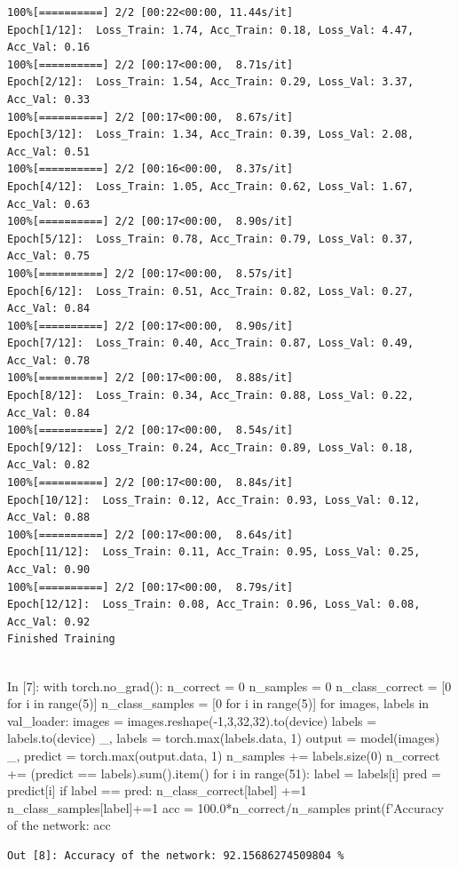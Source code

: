 \documentclass[12pt, a4paper]{article}
\begin{document}
\begin{verbatim}
100%[==========] 2/2 [00:22<00:00, 11.44s/it]
Epoch[1/12]:  Loss_Train: 1.74, Acc_Train: 0.18, Loss_Val: 4.47, Acc_Val: 0.16
100%[==========] 2/2 [00:17<00:00,  8.71s/it]
Epoch[2/12]:  Loss_Train: 1.54, Acc_Train: 0.29, Loss_Val: 3.37, Acc_Val: 0.33
100%[==========] 2/2 [00:17<00:00,  8.67s/it]
Epoch[3/12]:  Loss_Train: 1.34, Acc_Train: 0.39, Loss_Val: 2.08, Acc_Val: 0.51
100%[==========] 2/2 [00:16<00:00,  8.37s/it]
Epoch[4/12]:  Loss_Train: 1.05, Acc_Train: 0.62, Loss_Val: 1.67, Acc_Val: 0.63
100%[==========] 2/2 [00:17<00:00,  8.90s/it]
Epoch[5/12]:  Loss_Train: 0.78, Acc_Train: 0.79, Loss_Val: 0.37, Acc_Val: 0.75
100%[==========] 2/2 [00:17<00:00,  8.57s/it]
Epoch[6/12]:  Loss_Train: 0.51, Acc_Train: 0.82, Loss_Val: 0.27, Acc_Val: 0.84
100%[==========] 2/2 [00:17<00:00,  8.90s/it]
Epoch[7/12]:  Loss_Train: 0.40, Acc_Train: 0.87, Loss_Val: 0.49, Acc_Val: 0.78
100%[==========] 2/2 [00:17<00:00,  8.88s/it]
Epoch[8/12]:  Loss_Train: 0.34, Acc_Train: 0.88, Loss_Val: 0.22, Acc_Val: 0.84
100%[==========] 2/2 [00:17<00:00,  8.54s/it]
Epoch[9/12]:  Loss_Train: 0.24, Acc_Train: 0.89, Loss_Val: 0.18, Acc_Val: 0.82
100%[==========] 2/2 [00:17<00:00,  8.84s/it]
Epoch[10/12]:  Loss_Train: 0.12, Acc_Train: 0.93, Loss_Val: 0.12, Acc_Val: 0.88
100%[==========] 2/2 [00:17<00:00,  8.64s/it]
Epoch[11/12]:  Loss_Train: 0.11, Acc_Train: 0.95, Loss_Val: 0.25, Acc_Val: 0.90
100%[==========] 2/2 [00:17<00:00,  8.79s/it]
Epoch[12/12]:  Loss_Train: 0.08, Acc_Train: 0.96, Loss_Val: 0.08, Acc_Val: 0.92
Finished Training
    
\end{verbatim}

\begin{python}
In [7]: with torch.no_grad():
            n_correct = 0
            n_samples = 0
            n_class_correct = [0 for i in range(5)]
            n_class_samples = [0 for i in range(5)]
            for images, labels in val_loader:
                images = images.reshape(-1,3,32,32).to(device)
                labels = labels.to(device)
                _, labels = torch.max(labels.data, 1)
                output = model(images)
                _, predict = torch.max(output.data, 1)
                n_samples += labels.size(0)
                n_correct += (predict == labels).sum().item()
                for i in range(51):
                    label = labels[i]
                    pred = predict[i]
                    if label == pred:
                        n_class_correct[label] +=1
                    n_class_samples[label]+=1     
            acc = 100.0*n_correct/n_samples
            print(f'Accuracy of the network: {acc} %
\end{python}
\begin{verbatim}
Out [8]: Accuracy of the network: 92.15686274509804 %
\end{verbatim}
\end{document}
